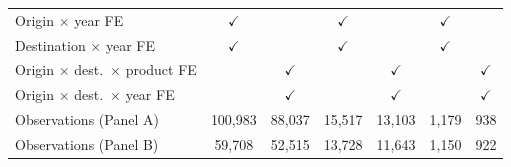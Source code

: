 \begin{tabular}{lcccccc}
Origin $\times$ year FE & $\checkmark$ &  & $\checkmark$ &  & $\checkmark$ &  \\
Destination $\times$ year FE & $\checkmark$ &  & $\checkmark$ &  & $\checkmark$ &  \\
Origin $\times$ dest.\ $\times$ product FE &  & $\checkmark$ &  & $\checkmark$ &  & $\checkmark$ \\
Origin $\times$ dest.\ $\times$ year FE &  & $\checkmark$ &  & $\checkmark$ &  & $\checkmark$ \\
Observations (Panel A) & 100,983 & 88,037 & 15,517 & 13,103 & 1,179 & 938 \\
Observations (Panel B) & 59,708 & 52,515 & 13,728 & 11,643 & 1,150 & 922 \\
\hline
\end{tabular}
